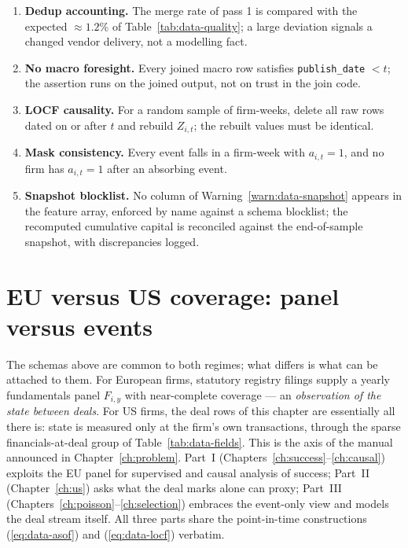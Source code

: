 \begin{enumerate}
\item \textbf{Dedup accounting.} The merge rate of pass 1 is compared with the
expected $\approx 1.2\%$ of Table~\ref{tab:data-quality}; a large deviation signals a
changed vendor delivery, not a modelling fact.
\item \textbf{No macro foresight.} Every joined macro row satisfies
\texttt{publish\_date} $< t$; the assertion runs on the joined output, not on trust
in the join code.
\item \textbf{LOCF causality.} For a random sample of firm-weeks, delete all raw rows
dated on or after $t$ and rebuild $Z_{i,t}$; the rebuilt values must be identical.
\item \textbf{Mask consistency.} Every event falls in a firm-week with
$a_{i,t} = 1$, and no firm has $a_{i,t} = 1$ after an absorbing event.
\item \textbf{Snapshot blocklist.} No column of Warning~\ref{warn:data-snapshot}
appears in the feature array, enforced by name against a schema blocklist; the
recomputed cumulative capital is reconciled against the end-of-sample snapshot, with
discrepancies logged.
\end{enumerate}

\section{EU versus US coverage: panel versus events}
\label{sec:data-euus}

The schemas above are common to both regimes; what differs is what can be attached to
them. For European firms, statutory registry filings supply a yearly fundamentals panel
$F_{i,y}$ with near-complete coverage --- an \emph{observation of the state between
deals}. For US firms, the deal rows of this chapter are essentially all there is: state
is measured only at the firm's own transactions, through the sparse financials-at-deal
group of Table~\ref{tab:data-fields}. This is the axis of the manual announced in
Chapter~\ref{ch:problem}. Part~I (Chapters~\ref{ch:success}--\ref{ch:causal}) exploits
the EU panel for supervised and causal analysis of success; Part~II
(Chapter~\ref{ch:us}) asks what the deal marks alone can proxy; Part~III
(Chapters~\ref{ch:poisson}--\ref{ch:selection}) embraces the event-only view and models
the deal stream itself. All three parts share the point-in-time constructions
(\ref{eq:data-asof}) and (\ref{eq:data-locf}) verbatim.

